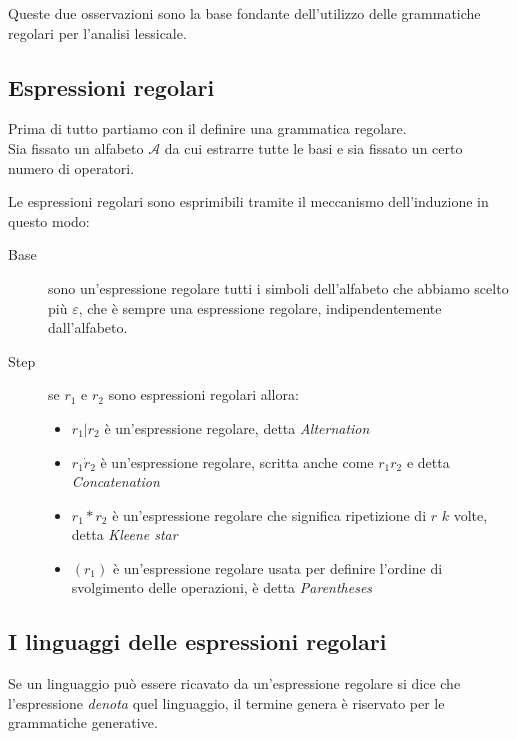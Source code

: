 \documentclass[class=book, crop=false, oneside, 12pt]{standalone}
\begin{document}
Queste due osservazioni sono la base fondante dell'utilizzo delle grammatiche regolari per l’analisi lessicale.


\subsection{Espressioni regolari}
Prima di tutto partiamo con il definire una grammatica regolare.\\
Sia fissato un alfabeto \(\mathcal{A}\) da cui estrarre tutte le basi e sia fissato un certo numero di operatori.

Le espressioni regolari sono esprimibili tramite il meccanismo dell'induzione in questo modo:
\begin{description}
    \item[Base] sono un'espressione regolare tutti i simboli dell’alfabeto che abbiamo scelto più \(\varepsilon\), che  è sempre una espressione regolare, indipendentemente dall’alfabeto.
    \item[Step] se \(r_1\) e \(r_2\) sono espressioni regolari allora:
    \begin{itemize}
        \item \(r_1 | r_2\) è un’espressione regolare, detta \emph{Alternation}
        \item \(r_1 \dot r_2\) è un’espressione regolare, scritta anche come \(r_1 r_2\) e detta \emph{Concatenation}
        \item \(r_1 * r_2\) è un’espressione regolare che significa ripetizione di \(r\) \(k\) volte, detta \emph{Kleene star}
        \item \((r_1)\) è un’espressione regolare usata per definire l’ordine di svolgimento delle operazioni, è detta \emph{Parentheses}
    \end{itemize} 
\end{description}

\subsection{I linguaggi delle espressioni regolari}
Se un linguaggio può essere ricavato da un'espressione regolare si dice che l'espressione \emph{denota} quel linguaggio, il termine genera è riservato per le grammatiche generative.
\end{document}
